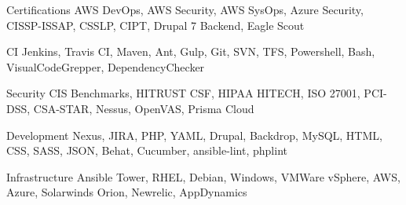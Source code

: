 


\begin{cvskills}


\cvskill
{Certifications}
{AWS DevOps, AWS Security, AWS SysOps, Azure Security, CISSP-ISSAP, CSSLP, CIPT, Drupal 7 Backend, Eagle Scout }

\cvskill
{CI}
{Jenkins, Travis CI, Maven, Ant, Gulp, Git, SVN, TFS, Powershell, Bash, VisualCodeGrepper, DependencyChecker }

\cvskill
{Security}
{CIS Benchmarks, HITRUST CSF, HIPAA HITECH, ISO 27001, PCI-DSS, CSA-STAR, Nessus, OpenVAS, Prisma Cloud }

\cvskill
{Development}
{Nexus, JIRA, PHP, YAML, Drupal, Backdrop, MySQL, HTML, CSS, SASS, JSON, Behat, Cucumber, ansible-lint, phplint }

\cvskill
{Infrastructure}
{Ansible Tower, RHEL, Debian, Windows, VMWare vSphere, AWS, Azure, Solarwinds Orion, Newrelic, AppDynamics }




\end{cvskills}
